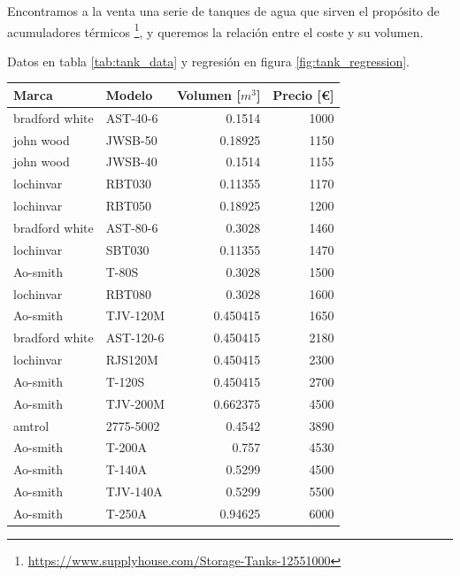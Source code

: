 Encontramos a la venta una serie de tanques de agua que sirven el propósito de
acumuladores térmicos
\footnote{\url{https://www.supplyhouse.com/Storage-Tanks-12551000}}, y queremos
la relación entre el coste y su volumen.

Datos en tabla \ref{tab:tank_data} y regresión en figura \ref{fig:tank_regression}.

\begin{table}[htbp]
	\centering
	\begin{tabular}{llrr}
		\toprule
		Marca          & Modelo    & Volumen [$m^3$] & Precio [\euro] \\
		\midrule
		bradford white & AST-40-6  & 0.1514          & 1000           \\
		john wood      & JWSB-50   & 0.18925         & 1150           \\
		john wood      & JWSB-40   & 0.1514          & 1155           \\
		lochinvar      & RBT030    & 0.11355         & 1170           \\
		lochinvar      & RBT050    & 0.18925         & 1200           \\
		bradford white & AST-80-6  & 0.3028          & 1460           \\
		lochinvar      & SBT030    & 0.11355         & 1470           \\
		Ao-smith       & T-80S     & 0.3028          & 1500           \\
		lochinvar      & RBT080    & 0.3028          & 1600           \\
		Ao-smith       & TJV-120M  & 0.450415        & 1650           \\
		bradford white & AST-120-6 & 0.450415        & 2180           \\
		lochinvar      & RJS120M   & 0.450415        & 2300           \\
		Ao-smith       & T-120S    & 0.450415        & 2700           \\
		Ao-smith       & TJV-200M  & 0.662375        & 4500           \\
		amtrol         & 2775-5002 & 0.4542          & 3890           \\
		Ao-smith       & T-200A    & 0.757           & 4530           \\
		Ao-smith       & T-140A    & 0.5299          & 4500           \\
		Ao-smith       & TJV-140A  & 0.5299          & 5500           \\
		Ao-smith       & T-250A    & 0.94625         & 6000           \\

\end{tabular}
\end{table}
